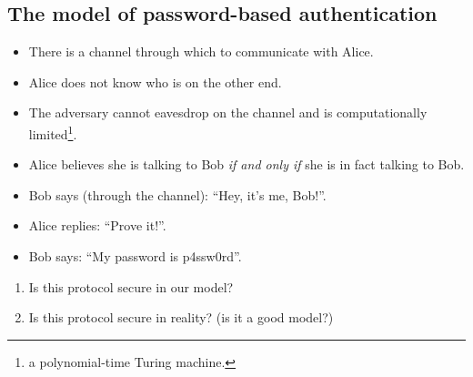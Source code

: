 \subsection{The model of password-based authentication}

\begin{frame}
  \begin{example}
    \begin{itemize}
      \item There is a channel through which to communicate with Alice.
      \item Alice does not know who is on the other end.
      \item The adversary cannot eavesdrop on the channel and is 
        computationally limited\footnote{\Ie a polynomial-time Turing 
          machine.}.
    \end{itemize}
  \end{example}

  \begin{example}
    \begin{itemize}
      \item Alice believes she is talking to Bob \emph{if and only if} she is 
        in fact talking to Bob.
    \end{itemize}
  \end{example}
\end{frame}

\begin{frame}
  \begin{example}
    \begin{itemize}
      \item Bob says (through the channel): \enquote{Hey, it's me, Bob!}.
      \item Alice replies: \enquote{Prove it!}.
      \item Bob says: \enquote{My password is p4ssw0rd}.
    \end{itemize}
  \end{example}

  \pause

  \begin{question}
    \begin{enumerate}
      \item Is this protocol secure in our model?
      \item Is this protocol secure in reality? (\Ie is it a good model?)
    \end{enumerate}
  \end{question}
\end{frame}

